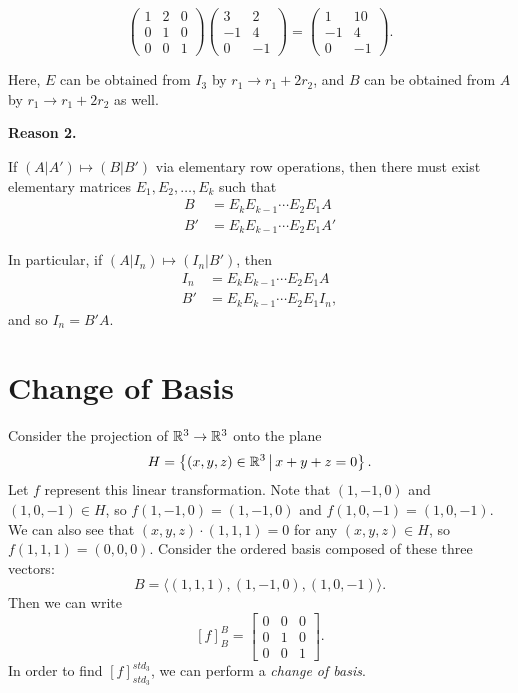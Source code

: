 \begin{exmp}
    \[\begin{pmatrix}
        1 & 2 & 0 \\ 0 & 1 & 0 \\ 0 & 0 & 1
    \end{pmatrix}\begin{pmatrix}
        3 & 2 \\ -1 & 4 \\ 0 & -1
    \end{pmatrix} = \begin{pmatrix}
        1 & 10 \\ -1 & 4 \\ 0 & -1
    \end{pmatrix}.\]

    Here, $E$ can be obtained from $I_3$ by $r_1 \to r_1 + 2r_2$, and $B$ can be obtained from $A$ by $r_1 \to r_1 + 2r_2$ as well.
\end{exmp}

\textbf{Reason 2.}

If $(A|A') \mapsto (B|B')$ via elementary row operations, then there must exist elementary matrices $E_1, E_2, \ldots, E_k$ such that
\begin{align*}
    B &= E_kE_{k-1}\cdots E_2E_1A \\
    B' &= E_kE_{k-1}\cdots E_2E_1A'
\end{align*}

In particular, if $(A|I_n) \mapsto (I_n|B')$, then
\begin{align*}
    I_n &= E_kE_{k-1}\cdots E_2E_1A \\
    B' &= E_kE_{k-1}\cdots E_2E_1I_n,
\end{align*}
and so $I_n = B'A$.

\section{Change of Basis}

\begin{exmp}\label{projection-basis-change-exmp}
    Consider the projection of $\mathbb{R}^3 \to \mathbb{R}^3$ onto the plane
    \[H = \left\{\left(x, y, z\right) \in \mathbb{R}^3 \,\middle|\, x + y + z = 0\right\}.\] Let $f$ represent this linear transformation. Note that $(1, -1, 0)$ and $(1, 0, -1) \in H$, so $f(1, -1, 0) = (1, -1, 0)$ and $f(1, 0, -1) = (1, 0, -1)$. We can also see that $(x, y, z) \cdot (1, 1, 1) = 0$ for any $(x, y, z) \in H$, so $f(1, 1, 1) = (0, 0, 0)$.
    Consider the ordered basis composed of these three vectors:
    \[B = \langle (1, 1, 1), (1, -1, 0), (1, 0, -1) \rangle.\] Then we can write
    \[[f]_B^B = \begin{bmatrix}
        0 & 0 & 0 \\
        0 & 1 & 0 \\
        0 & 0 & 1
    \end{bmatrix}.\] In order to find $[f]_{std_3}^{std_3}$, we can perform a \emph{change of basis}.
\end{exmp}

